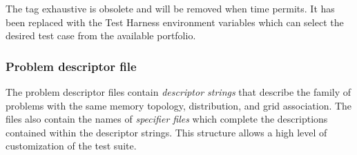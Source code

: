 The tag exhaustive is obsolete and will be removed when time permits.  It has been replaced with the Test Harness
environment variables which can select the desired test case from the available portfolio.

\subsubsection{Problem descriptor file}
\label{sec:harness_problemdescriptorfile}

The problem descriptor files contain \textit{descriptor strings} that describe the family 
of problems with the same memory topology, distribution, and grid association. 
The files also contain the names of \textit{specifier files} which complete the descriptions 
contained within the descriptor strings. This structure allows a high level of customization of the test suite.

